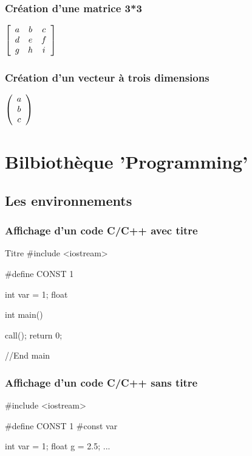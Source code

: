 \subsection{Création d'une matrice 3*3}


$\left [\begin{array}{ccc} a & b & c \\ d & e & f \\ g & h & i\end{array} \right ]  $

\subsection{Création d'un vecteur à trois dimensions}
$\left (\begin{array}{ccc} a \\ b \\ c\end{array} \right )  $





\chapter{Bilbiothèque 'Programming'}


\section{Les environnements}


\subsection{Affichage d'un code C/C++ avec titre}


\begin{Cpp}{Titre}
#include <iostream>

#define CONST 1

int var = 1;
float 

int main() {
  
  call();
  return 0;

}//End main

\end{Cpp}
\subsection{Affichage d'un code C/C++ sans titre}


\begin{Cpp}
#include <iostream>

#define CONST 1 #const var

int var = 1;
float g = 2.5;
...

\end{Cpp}


